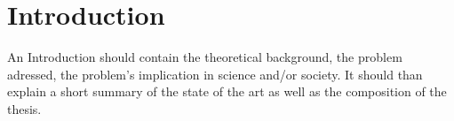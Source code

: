 \chapter{Introduction}
An Introduction should contain the theoretical background, the problem adressed, the problem's implication in science and/or society. It should than explain a short summary of the state of the art  as well as the composition of the thesis.